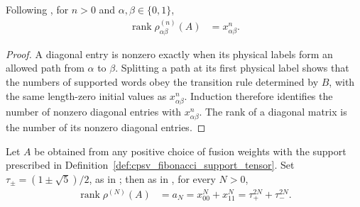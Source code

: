 \begin{lemma}
    \label{thm:cpsv_fibonacci_open_boundary_rank}
    \leanok
    Following \cite[Appendix~D, lines~2127--2130]{Cirac2016MPDO_arXiv}, for
    $n>0$ and $\alpha,\beta\in\{0,1\}$,
    \begin{align}
        \operatorname{rank}\rho^{(n)}_{\alpha\beta}(A)
         & =x^n_{\alpha\beta}.
    \end{align}
\end{lemma}

\begin{proof}
    \leanok
    A diagonal entry is nonzero exactly when its physical labels form an allowed
    path from $\alpha$ to $\beta$. Splitting a path at its first physical label
    shows that the numbers of supported words obey the transition rule determined
    by $B$, with the same length-zero initial values as $x^n_{\alpha\beta}$.
    Induction therefore identifies the number of nonzero diagonal entries with
    $x^n_{\alpha\beta}$. The rank of a diagonal matrix is the number of its nonzero
    diagonal entries.
\end{proof}

\begin{lemma}
    \label{thm:cpsv_fibonacci_periodic_rank}
    \leanok
    Let $A$ be obtained from any positive choice of fusion weights with the
    support prescribed in Definition~\ref{def:cpsv_fibonacci_support_tensor}.
    Set $\tau_\pm=(1\pm\sqrt5)/2$, as in
    \cite[Appendix~D, line~2125]{Cirac2016MPDO_arXiv}; then as in
    \cite[Appendix~D, lines~2122--2125 and
        2157--2176]{Cirac2016MPDO_arXiv}, for every $N>0$,
    \begin{align}
        \operatorname{rank}\rho^{(N)}(A)
         & =a_N=x^N_{00}+x^N_{11}
        =\tau_+^{2N}+\tau_-^{2N}.
        \label{eq:cpsv_fib_periodic_rank}
    \end{align}
\end{lemma}

